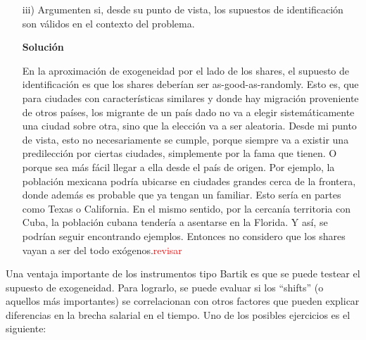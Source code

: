 \documentclass[a4paper, answers, addpoints, 11pt]{exam}
\newenvironment{solucion}{%
  \begin{mdframed}[
    backgroundcolor=blue!5,    %
    linecolor=blue!50,          %
    linewidth=2pt,              %
    leftmargin=10pt,            %
    rightmargin=8pt,           %
    topline=true,              %
    bottomline=true,            %
    roundcorner=10pt,           %
    innerleftmargin=10pt,       %
    innerrightmargin=10pt,      %
    innerbottommargin=10pt,     %
    innertopmargin=10pt         %
  ]%
  \begin{tcolorbox}[colframe=blue!50!black, colback=blue!50, coltitle=white, sharp corners=all, boxrule=1mm, width=\textwidth, halign=left, valign=center, top=0mm, bottom=0mm, left=0mm, right=0mm] \textbf{Solución} \end{tcolorbox} }{\end{mdframed}}
\begin{document}
\begin{itemize}
\begin{itemize}
\begin{solucion}
Las regresiones incluyen controles por logaritmo de población, proporción de estudiantes universitarios e industria manufacturera en 1980 y 1990. Los estadísticos F de la primera etapa son sólidos (por ejemplo, 40.62 en el caso COLL-IV), lo que respalda la relevancia del instrumento shift-share. El R$^2$ oscila entre 0.20 y 0.38, lo que indica una capacidad explicativa razonable del modelo.
\end{solucion}
    \item[iii)] Argumenten si, desde su punto de vista, los supuestos de identificación son válidos en el contexto del problema.
    \begin{solucion}
    En la aproximación de exogeneidad por el lado de los shares, el supuesto de identificación es que los shares deberían ser as-good-as-randomly. Esto es, que para ciudades con características similares y donde hay migración proveniente de otros países, los migrante de un país dado no va a elegir sistemáticamente una ciudad sobre otra, sino que la elección va a ser aleatoria. Desde mi punto de vista, esto no necesariamente se cumple, porque siempre va a existir una predilección por ciertas ciudades, simplemente por la fama que tienen. O porque sea más fácil llegar a ella desde el país de origen. Por ejemplo, la población mexicana podría ubicarse en ciudades grandes cerca de la frontera, donde además es probable que ya tengan un familiar. Esto sería en partes como Texas o California. En el mismo sentido, por la cercanía territoria con Cuba, la población cubana tendería a asentarse en la Florida. Y así, se podrían seguir encontrando ejemplos. Entonces no considero que los shares vayan a ser del todo exógenos.\textcolor{red}{revisar}
\end{solucion}

    
   
    
    \end{itemize}
    
\end{itemize}

Una ventaja importante de los instrumentos tipo Bartik es que se puede testear el supuesto de exogeneidad. Para lograrlo, se puede evaluar si los ``shifts'' (o aquellos más importantes) se correlacionan con otros factores que pueden explicar diferencias en la brecha salarial en el tiempo. Uno de los posibles ejercicios es el siguiente: \\
\end{document}
